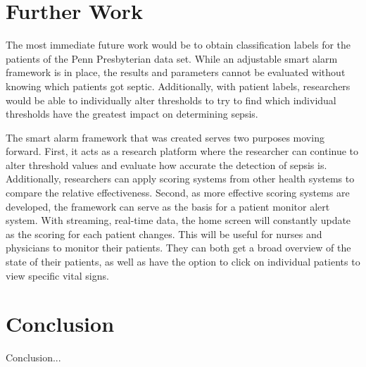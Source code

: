 \documentclass{sig-alternate}
\begin{document}
\section{Further Work}
\vspace{10pt}
\label{sec:furtherwork}

The most immediate future work would be to obtain classification labels for the patients of the Penn Presbyterian data set.  While an adjustable smart alarm framework is in place, the results and parameters cannot be evaluated without knowing which patients got septic.  Additionally, with patient labels, researchers would be able to individually alter thresholds to try to find which individual thresholds have the greatest impact on determining sepsis.  

The smart alarm framework that was created serves two purposes moving forward.  First, it acts as a research platform where the researcher can continue to alter threshold values and evaluate how accurate the detection of sepsis is.  Additionally, researchers can apply scoring systems from other health systems to compare the relative effectiveness.  Second, as more effective scoring systems are developed, the framework can serve as the basis for a patient monitor alert system.  With streaming, real-time data, the home screen will constantly update as the scoring for each patient changes.  This will be useful for nurses and physicians to monitor their patients.  They can both get a broad overview of the state of their patients, as well as have the option to click on individual patients to view specific vital signs.

\section{Conclusion}
\vspace{10pt}
\label{sec:conclusion}

Conclusion...





\vspace{10pt}

\vspace{10pt}
\appendix
\end{document}

